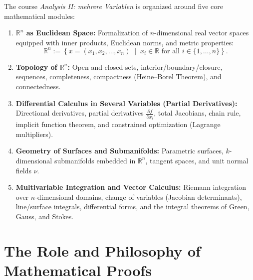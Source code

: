 \begin{math-stroke}
The course \emph{Analysis II: mehrere Variablen} is organized around five core mathematical modules:

\begin{enumerate}[label=\textbf{\arabic*.}]
    \item \textbf{$\mathbb{R}^n$ as Euclidean Space:} Formalization of $n$-dimensional real vector spaces equipped with inner products, Euclidean norms, and metric properties:
    \begin{equation}\label{eq:rn-def}
    \mathbb{R}^n := \left\{ x = (x_1, x_2, \dots, x_n) \;\middle|\; x_i \in \mathbb{R} \text{ for all } i \in \{1, \dots, n\} \right\}.
    \end{equation}
    \item \textbf{Topology of $\mathbb{R}^n$:} Open and closed sets, interior/boundary/closure, sequences, completeness, compactness (Heine--Borel Theorem), and connectedness.
    \item \textbf{Differential Calculus in Several Variables (Partial Derivatives):} Directional derivatives, partial derivatives $\frac{\partial f}{\partial x_i}$, total Jacobians, chain rule, implicit function theorem, and constrained optimization (Lagrange multipliers).
    \item \textbf{Geometry of Surfaces and Submanifolds:} Parametric surfaces, $k$-dimensional submanifolds embedded in $\mathbb{R}^n$, tangent spaces, and unit normal fields $\nu$.
    \item \textbf{Multivariable Integration and Vector Calculus:} Riemann integration over $n$-dimensional domains, change of variables (Jacobian determinants), line/surface integrals, differential forms, and the integral theorems of Green, Gauss, and Stokes.
\end{enumerate}
\end{math-stroke}

\begin{ai-global-state-checkpoint-invisible-content}
\end{ai-global-state-checkpoint-invisible-content}

\section{The Role and Philosophy of Mathematical Proofs}

